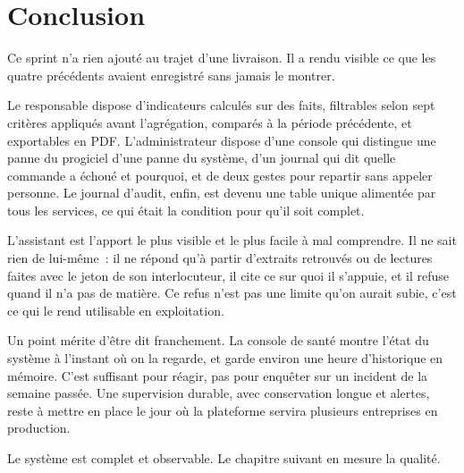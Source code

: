 \section{Conclusion}

Ce sprint n'a rien ajouté au trajet d'une livraison. Il a rendu visible ce que les quatre précédents
avaient enregistré sans jamais le montrer.

Le responsable dispose d'indicateurs calculés sur des faits, filtrables selon sept critères appliqués
avant l'agrégation, comparés à la période précédente, et exportables en PDF. L'administrateur dispose
d'une console qui distingue une panne du progiciel d'une panne du système, d'un journal qui dit quelle
commande a échoué et pourquoi, et de deux gestes pour repartir sans appeler personne. Le journal
d'audit, enfin, est devenu une table unique alimentée par tous les services, ce qui était la
condition pour qu'il soit complet.

L'assistant est l'apport le plus visible et le plus facile à mal comprendre. Il ne sait rien de
lui-même~: il ne répond qu'à partir d'extraits retrouvés ou de lectures faites avec le jeton de son
interlocuteur, il cite ce sur quoi il s'appuie, et il refuse quand il n'a pas de matière. Ce refus
n'est pas une limite qu'on aurait subie, c'est ce qui le rend utilisable en exploitation.

Un point mérite d'être dit franchement. La console de santé montre l'état du système à l'instant où on
la regarde, et garde environ une heure d'historique en mémoire. C'est suffisant pour réagir, pas pour
enquêter sur un incident de la semaine passée. Une supervision durable, avec conservation longue et
alertes, reste à mettre en place le jour où la plateforme servira plusieurs entreprises en production.

Le système est complet et observable. Le chapitre suivant en mesure la qualité.
